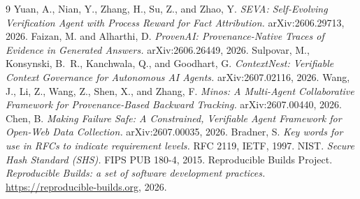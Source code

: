 \documentclass[11pt]{article}
\begin{document}
\begin{thebibliography}{9}
\small
{} Yuan, A., Nian, Y., Zhang, H., Su, Z., and Zhao, Y. \emph{SEVA: Self-Evolving Verification Agent with Process Reward for Fact Attribution.} arXiv:2606.29713, 2026.
 Faizan, M. and Alharthi, D. \emph{ProvenAI: Provenance-Native Traces of Evidence in Generated Answers.} arXiv:2606.26449, 2026.
 Sulpovar, M., Konsynski, B.~R., Kanchwala, Q., and Goodhart, G. \emph{ContextNest: Verifiable Context Governance for Autonomous AI Agents.} arXiv:2607.02116, 2026.
 Wang, J., Li, Z., Wang, Z., Shen, X., and Zhang, F. \emph{Minos: A Multi-Agent Collaborative Framework for Provenance-Based Backward Tracking.} arXiv:2607.00440, 2026.
 Chen, B. \emph{Making Failure Safe: A Constrained, Verifiable Agent Framework for Open-Web Data Collection.} arXiv:2607.00035, 2026.
 Bradner, S. \emph{Key words for use in RFCs to indicate requirement levels.} RFC 2119, IETF, 1997.
 NIST. \emph{Secure Hash Standard (SHS).} FIPS PUB 180-4, 2015.
 Reproducible Builds Project. \emph{Reproducible Builds: a set of software development practices.} \url{https://reproducible-builds.org}, 2026.
\end{thebibliography}
\end{document}
